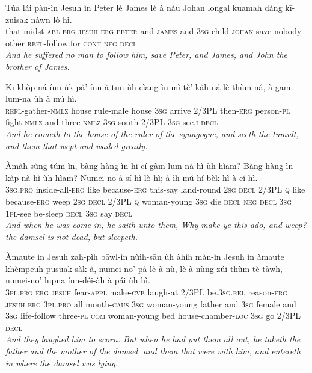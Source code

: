 \documentclass[11pt,a4paper]{article}
\begin{document}
\begin{exe}
\gll Túa lái pàn-ìn Jesuh ìn Peter lè James lè à nàu Johan longal kuamah dàng kī-zuisak nàwn lò hì. \\
     that midst \textsc{abl}-\textsc{erg} \textsc{jesuh} \textsc{erg} \textsc{peter} and \textsc{james} and \textsc{3sg} child \textsc{johan} save nobody other \textsc{refl}-follow.for \textsc{cont} \textsc{neg} \textsc{decl} \\
\glt \textcolor{kjvcolor}{\textit{And he suffered no man to follow him, save Peter, and James, and John the brother of James.}}

\gll Kī-khòp-ná ínn ùk-pà' ínn à tun ùh cìang-ìn mì-tè' kàh-ná lè thùm-ná, à gam-lum-na ùh à mú hì. \\
     \textsc{refl}-gather-\textsc{nmlz} house rule-male house \textsc{3sg} arrive 2/3PL then-\textsc{erg} person-\textsc{pl} fight-\textsc{nmlz} and three-\textsc{nmlz} \textsc{3sg} south 2/3PL \textsc{3sg} see.\textsc{i} \textsc{decl} \\
\glt \textcolor{kjvcolor}{\textit{And he cometh to the house of the ruler of the synagogue, and seeth the tumult, and them that wept and wailed greatly.}}

\gll Àmàh sùng-túm-ìn, bàng hàng-ìn hi-cí gàm-lum nà hì ùh hìam? Bàng hàng-ìn kàp nà hì ùh hìam? Numei-no à sí hì lò hì; à ìh-mú hí-bèk hì à cí hì. \\
     \textsc{3sg}.\textsc{pro} inside-all-\textsc{erg} like because-\textsc{erg} this-say land-round \textsc{2sg} \textsc{decl} 2/3PL \textsc{q} like because-\textsc{erg} weep \textsc{2sg} \textsc{decl} 2/3PL \textsc{q} woman-young \textsc{3sg} die \textsc{decl} \textsc{neg} \textsc{decl} \textsc{3sg} \textsc{1pl}-see be-sleep \textsc{decl} \textsc{3sg} say \textsc{decl} \\
\glt \textcolor{kjvcolor}{\textit{And when he was come in, he saith unto them, Why make ye this ado, and weep? the damsel is not dead, but sleepeth.}}

\gll Àmaute ìn Jesuh zah-pìh bāwl-ìn nùih-sān ùh àhìh màn-ìn Jesuh ìn àmaute khèmpeuh pusuak-sàk à, numei-no' pà lè à nù, lè à nùng-zúi thùm-tè tàwh, numei-no' lupna ínn-déi-àh à pái ùh hì. \\
     \textsc{3pl}.\textsc{pro} \textsc{erg} \textsc{jesuh} fear-\textsc{appl} make-\textsc{cvb} laugh-at 2/3PL be.\textsc{3sg}.\textsc{rel} reason-\textsc{erg} \textsc{jesuh} \textsc{erg} \textsc{3pl}.\textsc{pro} all mouth-\textsc{caus} \textsc{3sg} woman-young father and \textsc{3sg} female and \textsc{3sg} life-follow three-\textsc{pl} \textsc{com} woman-young bed house-chamber-\textsc{loc} \textsc{3sg} go 2/3PL \textsc{decl} \\
\glt \textcolor{kjvcolor}{\textit{And they laughed him to scorn. But when he had put them all out, he taketh the father and the mother of the damsel, and them that were with him, and entereth in where the damsel was lying.}}


\end{exe}
\end{document}
